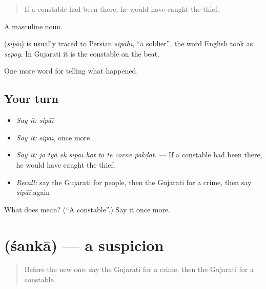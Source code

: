 \begin{quote}
If a constable had been there, he would have caught the thief.
\end{quote}

A masculine noun.

\begin{cousinweb}
\textbf{} (\emph{sipāī}) is usually traced to Persian \emph{sipāhī}, \textquotedblleft{}a soldier\textquotedblright{}, the word English took as \emph{sepoy}. In Gujarati it is the constable on the beat.
\end{cousinweb}

\begin{grammarlens}[title={What you've built}]
One more word for telling what happened.
\end{grammarlens}

\subsection*{Your turn}
\begin{itemize}
\raggedright
  \item \emph{Say it:} \emph{sipāī}
  \item \emph{Say it:} \emph{sipāī}, once more
  \item \emph{Say it:} \emph{jo tyā̃ ek sipāī hot to te corne pakḍat.} — If a constable had been there, he would have caught the thief.
  \item \emph{Recall:} say the Gujarati for people, then the Gujarati for a crime, then say \emph{sipāī} again
\end{itemize}

\begin{tcolorbox}[breakable,colback=teal!4,colframe=teal!35!black,title={Before you move on}]
What does  mean? (\textquotedblleft{}A constable\textquotedblright{}.) Say it once more.
\end{tcolorbox}
\section[\texorpdfstring{\gu{શંકા} (śankā)}{શંકા (śankā)}]{ (śankā) — a suspicion}

\label{lesson:GU-C286-sanka}



\begin{quote}
Before the new one: say the Gujarati for a crime, then the Gujarati for a constable.
\end{quote}

